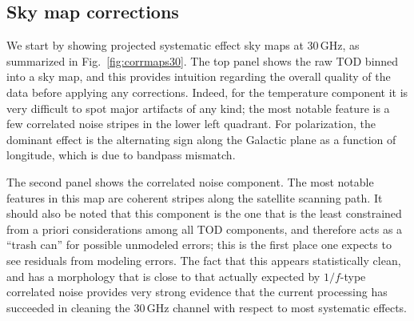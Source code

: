 \documentclass[twocolumn]{aa}
\begin{document}
\subsection{Sky map corrections}

We start by showing projected systematic effect sky maps at 30\,GHz, as
summarized in Fig.~\ref{fig:corrmaps30}. The top panel shows the raw
TOD binned into a sky map, and this provides intuition regarding the
overall quality of the data before applying any corrections. Indeed,
for the temperature component it is very difficult to spot major
artifacts of any kind; the most notable feature is a few correlated
noise stripes in the lower left quadrant. For polarization, the
dominant effect is the alternating sign along the Galactic plane as a
function of longitude, which is due to bandpass mismatch.

The second panel shows the correlated noise component. The most
notable features in this map are coherent stripes along the satellite
scanning path. It should also be noted that this component is the one
that is the least constrained from a priori considerations among all
TOD components, and therefore acts as a ``trash can'' for possible
unmodeled errors; this is the first place one expects to see
residuals from modeling errors. The fact that this appears
statistically clean, and has a morphology that is close to that
actually expected by $1/f$-type correlated noise provides very strong
evidence that the current processing has succeeded in cleaning the
30\,GHz channel with respect to most systematic effects.
\end{document}
